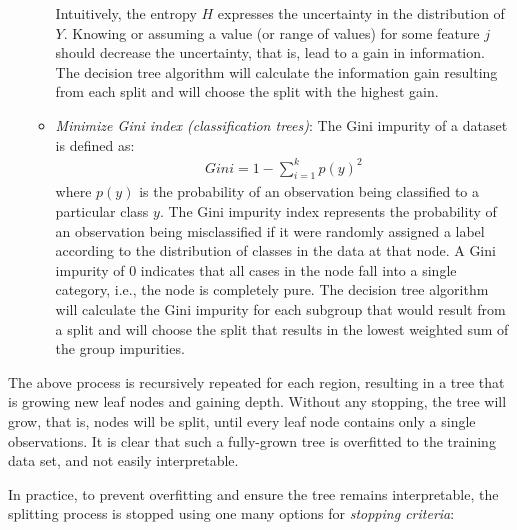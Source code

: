 \begin{enumerate}
\begin{itemize}
       Intuitively, the entropy $H$ expresses the uncertainty in the distribution of $Y$. Knowing or assuming a value (or range of values) for some feature $j$ should decrease the uncertainty, that is, lead to a gain in information. The decision tree algorithm will calculate the information gain resulting from each split and will choose the split with the highest gain.
   \item \emph{Minimize Gini index (classification trees)}:
   The Gini impurity of a dataset is defined as:
\begin{align*}
Gini = 1 - \sum_{i=1}^k p(y)^2
\end{align*}
where $p(y)$ is the probability of an observation being classified to a particular class $y$. The Gini impurity index represents the probability of an observation being misclassified if it were randomly assigned a label according to the distribution of classes in the data at that node. A Gini impurity of 0 indicates that all cases in the node fall into a single category, i.e., the node is completely pure. The decision tree algorithm will calculate the Gini impurity for each subgroup that would result from a split and will choose the split that results in the lowest weighted sum of the group impurities.
\end{itemize}
\end{enumerate}

The above process is recursively repeated for each region, resulting in a tree that is growing new leaf nodes and gaining depth. Without any stopping, the tree will grow, that is, nodes will be split, until every leaf node contains only a single observations. It is clear that such a fully-grown tree is overfitted to the training data set, and not easily interpretable. 

In practice, to prevent overfitting and ensure the tree remains interpretable, the splitting process is stopped using one many options for \emph{stopping criteria}:

